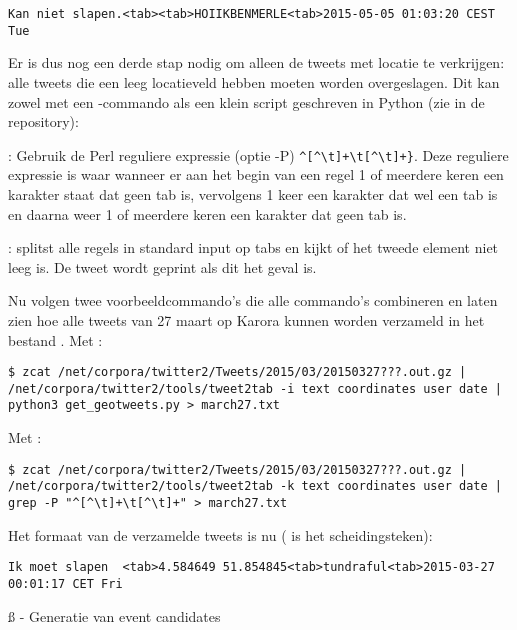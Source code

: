 {{\begin{lstlisting}
Kan niet slapen.<tab><tab>HOIIKBENMERLE<tab>2015-05-05 01:03:20 CEST Tue 
\end{lstlisting}

Er is dus nog een derde stap nodig om alleen de tweets met locatie te 
verkrijgen: alle tweets die een leeg locatieveld hebben moeten worden 
overgeslagen. Dit kan zowel met een -commando als een klein script 
geschreven in Python (zie  in de repository):

\begin{bullets}
\item {}: Gebruik de Perl reguliere expressie (optie -P) 
\verb|^[^\t]+\t[^\t]+}|. Deze reguliere expressie is waar wanneer er aan het 
begin van een regel 1 of meerdere keren een karakter staat dat geen tab is, 
vervolgens 1 keer een karakter dat wel een tab is en daarna weer 1 of meerdere 
keren een karakter dat geen tab is.
\item {}: splitst alle regels in standard input op tabs en 
kijkt of 
het tweede element niet leeg is. De tweet wordt geprint als dit het geval is.
\end{bullets}

Nu volgen twee voorbeeldcommando's die alle commando's combineren en laten zien 
hoe alle tweets van 27 maart op Karora kunnen worden verzameld in het bestand 
.
\vl
Met :
\begin{lstlisting}
$ zcat /net/corpora/twitter2/Tweets/2015/03/20150327???.out.gz | 
/net/corpora/twitter2/tools/tweet2tab -i text coordinates user date | 
python3 get_geotweets.py > march27.txt
\end{lstlisting}

Met :
\begin{lstlisting}
$ zcat /net/corpora/twitter2/Tweets/2015/03/20150327???.out.gz | 
/net/corpora/twitter2/tools/tweet2tab -k text coordinates user date | 
grep -P "^[^\t]+\t[^\t]+" > march27.txt
\end{lstlisting}

Het formaat van de verzamelde tweets is nu ( is het scheidingsteken):
\begin{lstlisting}
Ik moet slapen	<tab>4.584649 51.854845<tab>tundraful<tab>2015-03-27 00:01:17 CET Fri 
\end{lstlisting}
\vspace*{-10pt}

\ss{ - Generatie van event candidates}\label{EventCandidates}

}}
